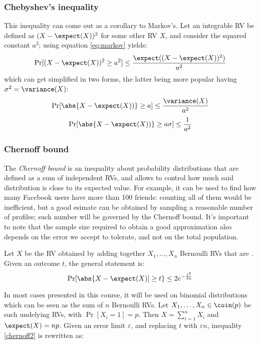 \subsubsection{Chebyshev's inequality}

This inequality can come out as a corollary to Markov's. Let an integrable RV be defined as $(X - \expect(X))^2$ for some other RV $X$, and consider the squared constant $a^2$; using equation \ref{eq:markov} yields:
\[
    \Pr[(X - \expect(X))^2 \geq a^2] \leq \frac{\expect((X - \expect(X))^2)}{a^2}
\]
which can get simplified in two forms, the latter being more popular having $\sigma^2 = \variance(X)$:
\begin{equation}\label{eq:chebyshev2}
    \Pr[\abs{X - \expect(X))} \geq a] \leq \frac{\variance(X)}{a^2}
\end{equation}
\begin{equation}\label{eq:chebyshev}
    \Pr[\abs{X - \expect(X))} \geq a \sigma] \leq \frac{1}{a^2}
\end{equation}


\subsubsection{Chernoff bound}

The \emph{Chernoff bound} is an inequality about probability distributions that are defined as a sum of independent RVs, and allows to control how much said distribution is close to its expected value. For example, it can be used to find how many Facebook users have more than 100 friends: counting all of them would be inefficient, but a good esimate can be obtained by sampling a reasonable number of profiles; such number will be governed by the Chernoff bound. It's important to note that the sample size required to obtain a good approximation also depends on the error we accept to tolerate, and not on the total population.

\begin{definition}
    Let $X$ be the RV obtained by adding together $X_1, \dots, X_n$ Bernoulli RVs that are \iid. Given an outcome $t$, the general statement is:
    \begin{equation}\label{chernoff2}
        \Pr[\abs{X - \expect(X)] \geq t} \leq 2e^{-\frac{t^2}{3n}}
    \end{equation}
\end{definition}

In most cases presented in this course, it will be used on binomial distributions which can be seen as the sum of $n$ \iid{} Bernoulli RVs. Let $X_1, \dots, X_n \in \coin(p)$ be such undelying RVs, with $\Pr[X_i = 1] = p$. Then $X = \sum_{i = 1}^{n} X_i$ and $\expect(X) = np$. Given an error limit $\varepsilon$, and replacing $t$ with $\varepsilon n$, inequality \ref{chernoff2} is rewritten as:

